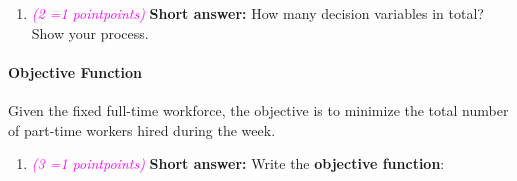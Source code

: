 \documentclass[11pt, letter, answers]{exam}
\newcommand{\grade}[1]{
    \small\textcolor{magenta}{\emph{(#1 \ifnum#1=1 point\else points\fi)}}%
    \normalsize
}
\newcommand{\saq}{\textbf{Short answer: }}
\begin{document}
\begin{enumerate}[label=(\alph*)]
\item \grade{2} \saq How many decision variables in total? Show your process.
\begin{answerBox}[height=1in]

\end{answerBox}
\end{enumerate}


\paragraph{Objective Function} Given the fixed full-time workforce, the objective is to minimize the total number of part-time workers hired during the week.

\begin{enumerate}[label=(\alph*), resume]
\item \grade{3} \saq Write the \textbf{objective function}:
\begin{answerBox}[height=1.2in]

\end{answerBox}
\end{enumerate}
\end{document}
